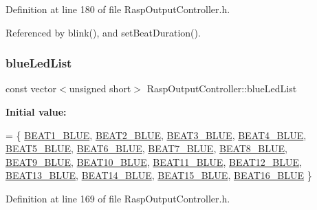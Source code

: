 Definition at line 180 of file Rasp\+Output\+Controller.\+h.



Referenced by blink(), and set\+Beat\+Duration().

\mbox{\label{class_rasp_output_controller_a9b5e5c4ee94d43d62e41961e6c8bea3b}} 
\subsubsection{\texorpdfstring{blue\+Led\+List}{blueLedList}}
{\footnotesize\ttfamily const vector$<$unsigned short$>$ Rasp\+Output\+Controller\+::blue\+Led\+List\hspace{0.3cm}{\ttfamily [private]}}

{\bfseries Initial value\+:}
\begin{DoxyCode}
= \{
            \hyperlink{namespaceoutputs_a7c39d2e5116c2502c2b90bf1e8be5520}{BEAT1\_BLUE}, \hyperlink{namespaceoutputs_ac6bffee9716f79b218c8fb366351032e}{BEAT2\_BLUE}, \hyperlink{namespaceoutputs_ae87166c20e497c5b092a92bc98da94c2}{BEAT3\_BLUE}, 
      \hyperlink{namespaceoutputs_aa66f074e1960dc7dbf507acdf6cc5ae3}{BEAT4\_BLUE}, \hyperlink{namespaceoutputs_a0fab71f89a857d67f1329fbd097046ae}{BEAT5\_BLUE}, \hyperlink{namespaceoutputs_a1981eea86b118b5ff49c09ee50a75221}{BEAT6\_BLUE}, \hyperlink{namespaceoutputs_a7051f5db20e6f0c0dc7dad8775d21b1f}{BEAT7\_BLUE}, 
      \hyperlink{namespaceoutputs_a29cf0b90cc4df367e62aaaa86e7ed24e}{BEAT8\_BLUE}, \hyperlink{namespaceoutputs_a1f88716cbf83123bc10bd31b07f86b4c}{BEAT9\_BLUE},
            \hyperlink{namespaceoutputs_a188668f7db5d9610361658c817b08574}{BEAT10\_BLUE}, \hyperlink{namespaceoutputs_a31d60b8c00551d3dbeca8645eba200eb}{BEAT11\_BLUE}, \hyperlink{namespaceoutputs_ae7b144325945c1712151bf0d6a363c5f}{BEAT12\_BLUE}, 
      \hyperlink{namespaceoutputs_a38a0eba17cc5ed8eed42c37dca1feb3f}{BEAT13\_BLUE}, \hyperlink{namespaceoutputs_ab384095ae250cb117a95683710620188}{BEAT14\_BLUE}, \hyperlink{namespaceoutputs_a6d12c95904da18827ed262896b9ebaa1}{BEAT15\_BLUE}, 
      \hyperlink{namespaceoutputs_aaa4685feacdb3e8d2bb1c0435952e030}{BEAT16\_BLUE}
    \}
\end{DoxyCode}


Definition at line 169 of file Rasp\+Output\+Controller.\+h.


